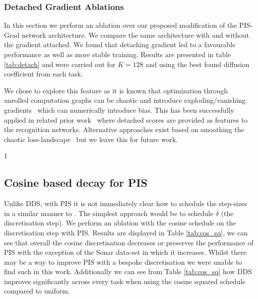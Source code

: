 \documentclass{article} %
\def\cossqablation{1}
\begin{document}
\subsubsection{Detached Gradient Ablations} \label{sec:detach_exp}

In this section we perform an ablation over our proposed modification of the PIS-Grad network architecture. We compare the same architecture with and without the gradient attached. We found that detaching gradient led to a favourable performance as well as more stable training. Results are presented in table \ref{tab:detach} and were carried out for $K=128$ and using the best found diffusion coefficient from each task.  

We chose to explore this feature as it is known that optimization through unrolled computation graphs can be chaotic and introduce exploding/vanishing gradients~\citep{parmas2018pipps, metz2020using} which can numerically introduce bias. This has been successfully applied in related prior work~\citep{greff2019multi} where detached scores are provided as features to the recognition networks. Alternative approaches exist based on smoothing the chaotic loss-landscape~\citep{vicol2021unbiased} but we leave this for future work.


\if\cossqablation1
\subsection{Cosine based decay for PIS}

Unlike DDS, with PIS it is not immediately clear how to schedule the step-sizes in a similar manner to \cite{nichol2021improved}. The simplest approach would be to schedule $\delta$ (the discretisation step). We perform an ablation with the cosine schedule on the discretisation step with PIS.  Results are displayed in Table \ref{tab:cos_sq}, we can see that overall the cosine discretisation decreases or preserves the performance of PIS with the exception of the Sonar data-set in which it increases. Whilst there may be a way to improve PIS with a bespoke discretisation we were unable to find such in this work. Additionally we can see from Table \ref{tab:cos_sq} how DDS improves significantly across every task when using the cosine squared schedule compared to uniform.
\end{document}
